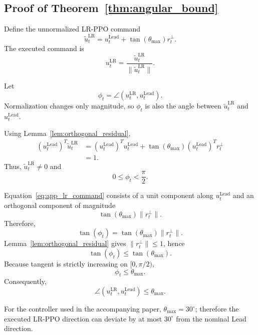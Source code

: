 \documentclass[10pt]{article}
\begin{document}
\subsection*{Proof of Theorem~\ref{thm:angular_bound}}

Define the unnormalized LR-PPO command
\begin{equation}
\tilde u_t^{\mathrm{LR}}
=
u_t^{\mathrm{Lead}}
+
\tan(\theta_{\max})r_t^\perp.
\label{eq:app_lr_command}
\end{equation}
The executed command is
\begin{equation}
u_t^{\mathrm{LR}}
=
\frac{\tilde u_t^{\mathrm{LR}}}
{\|\tilde u_t^{\mathrm{LR}}\|}.
\label{eq:app_lr_normalized}
\end{equation}

Let
\begin{equation}
\phi_t
=
\angle
\left(
u_t^{\mathrm{LR}},
u_t^{\mathrm{Lead}}
\right).
\end{equation}
Normalization changes only magnitude, so \(\phi_t\) is also the angle between
\(\tilde u_t^{\mathrm{LR}}\) and \(u_t^{\mathrm{Lead}}\).

Using Lemma~\ref{lem:orthogonal_residual},
\begin{align}
\left(u_t^{\mathrm{Lead}}\right)^T
\tilde u_t^{\mathrm{LR}}
&=
\left(u_t^{\mathrm{Lead}}\right)^T
u_t^{\mathrm{Lead}}
+
\tan(\theta_{\max})
\left(u_t^{\mathrm{Lead}}\right)^T
r_t^\perp \\
&=1.
\end{align}
Thus,
\(\tilde u_t^{\mathrm{LR}}\neq0\) and
\[
0\leq\phi_t<\frac{\pi}{2}.
\]

Equation~\eqref{eq:app_lr_command} consists of a unit component along
\(u_t^{\mathrm{Lead}}\) and an orthogonal component of magnitude
\[
\tan(\theta_{\max})\|r_t^\perp\|.
\]
Therefore,
\begin{equation}
\tan(\phi_t)
=
\tan(\theta_{\max})\|r_t^\perp\|.
\label{eq:app_angle_relation}
\end{equation}
Lemma~\ref{lem:orthogonal_residual} gives
\(
\|r_t^\perp\|\leq1
\),
hence
\[
\tan(\phi_t)
\leq
\tan(\theta_{\max}).
\]
Because tangent is strictly increasing on
\([0,\pi/2)\),
\[
\phi_t
\leq
\theta_{\max}.
\]
Consequently,
\begin{equation}
\angle
\left(
u_t^{\mathrm{LR}},
u_t^{\mathrm{Lead}}
\right)
\leq
\theta_{\max}.
\end{equation}

For the controller used in the accompanying paper,
\(\theta_{\max}=30^\circ\); therefore the executed LR-PPO direction can deviate
by at most \(30^\circ\) from the nominal Lead direction.
\end{document}
